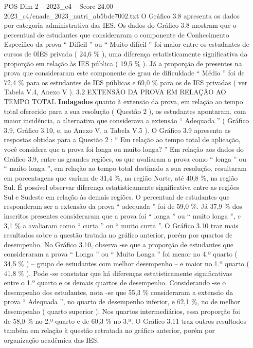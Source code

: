 \begin{textsample}{POS Dim 2 – 2023\_c4 – Score 24.00 – 2023\_c4/enade\_2023\_nutri\_ab5bde7002.txt}
O Gráfico 3.8 apresenta os dados por categoria administrativa das IES.
Os dados do Gráfico 3.8 mostram que o percentual de estudantes que consideraram o componente de Conhecimento Específico da prova “ Difícil ” ou “ Muito difícil ” foi maior entre os estudantes de cursos de 0IES privada ( 24,6 \% ), uma diferença estatisticamente significativa da proporção em relação às IES pública ( 19,5 \% ).
Já a proporção de presentes na prova que consideraram este componente de grau de dificuldade “ Médio ” foi de 72,4 \% para os estudantes de IES públicas e 69,0 \% para os de IES privadas ( ver Tabela V.4, Anexo V ). 3.2 EXTENSÃO DA PROVA EM RELAÇÃO AO TEMPO TOTAL \textbf{Indagados} quanto à extensão da prova, em relação ao tempo total oferecido para a sua resolução ( Questão 2 ), os estudantes apontaram, com maior incidência, a alternativa que considerava a extensão “ Adequada ” ( Gráfico 3.9, Gráfico 3.10, e, no Anexo V, a Tabela V.5 ).
O Gráfico 3.9 apresenta as respostas obtidas para a Questão 2 : “ Em relação ao tempo total de aplicação, você considera que a prova foi longa ou muito longa? ” Em relação aos dados do Gráfico 3.9, entre as grandes regiões, os que avaliaram a prova como “ longa ” ou “ muito longa ”, em relação ao tempo total destinado a sua resolução, resultaram em porcentagens que variam de 31,4 \%, na região Norte, até 40,8 \%, na região Sul.
É possível observar diferença estatisticamente significativa entre as regiões Sul e Sudeste em relação às demais regiões.
O percentual de estudantes que responderam ser a extensão da prova “ adequada ” foi de 59,0 \%.
Já 37,9 \% dos inscritos presentes consideraram que a prova foi “ longa ” ou “ muito longa ”, e 3,1 \% a avaliaram como “ curta ” ou “ muito curta ”.
O Gráfico 3.10 traz mais resultados sobre a questão tratada no gráfico anterior, porém por quartos de desempenho.
No Gráfico 3.10, observa -se que a proporção de estudantes que consideraram a prova “ Longa ” ou “ Muito Longa ” foi menor no 4.º quarto ( 34,5 \% ) – grupo de estudantes com melhor desempenho – e maior no 1.º quarto ( 41,8 \% ).
Pode -se constatar que há diferenças estatisticamente significativas entre o 1.º quarto e os demais quartos de desempenho.
Considerando -se o desempenho dos estudantes, nota -se que 55,3 \% consideraram a extensão da prova “ Adequada ”, no quarto de desempenho inferior, e 62,1 \%, no de melhor desempenho ( quarto superior ).
Nos quartos intermediários, essa proporção foi de 58,0 \% no 2.º quarto e de 60,3 \% no 3.º.
O Gráfico 3.11 traz outros resultados também em relação à questão retratada no gráfico anterior, porém por organização acadêmica das IES.

\end{textsample}
